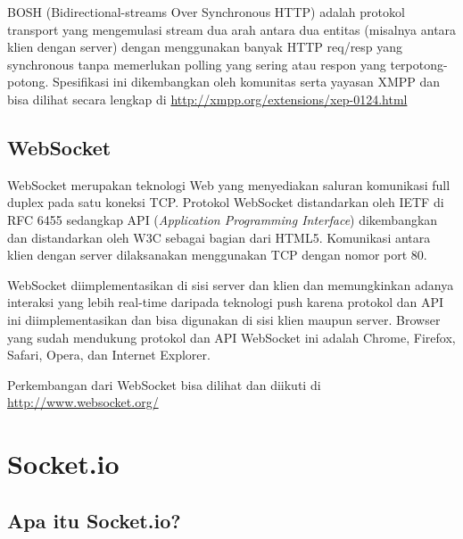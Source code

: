 BOSH (Bidirectional-streams Over Synchronous HTTP) adalah protokol transport yang mengemulasi stream dua arah antara dua entitas (misalnya antara klien dengan server) dengan menggunakan banyak HTTP req/resp yang synchronous tanpa memerlukan polling yang sering atau respon yang terpotong-potong. Spesifikasi ini dikembangkan oleh komunitas serta yayasan XMPP dan bisa dilihat secara lengkap di \url{http://xmpp.org/extensions/xep-0124.html}

\subsection{WebSocket}

WebSocket merupakan teknologi Web yang menyediakan saluran komunikasi full duplex pada satu koneksi TCP. Protokol WebSocket distandarkan oleh IETF di RFC 6455 sedangkap API (\textit{Application Programming Interface}) dikembangkan dan distandarkan oleh W3C sebagai bagian dari HTML5. Komunikasi antara klien dengan server dilaksanakan menggunakan TCP dengan nomor port 80.

WebSocket diimplementasikan di sisi server dan klien dan memungkinkan adanya interaksi yang lebih real-time daripada teknologi push karena protokol dan API ini diimplementasikan dan bisa digunakan di sisi klien maupun server. Browser yang sudah mendukung protokol dan API WebSocket ini adalah Chrome, Firefox, Safari, Opera, dan Internet Explorer. 

Perkembangan dari WebSocket bisa dilihat dan diikuti di \url{http://www.websocket.org/}

\section{Socket.io}

\subsection{Apa itu Socket.io?}

